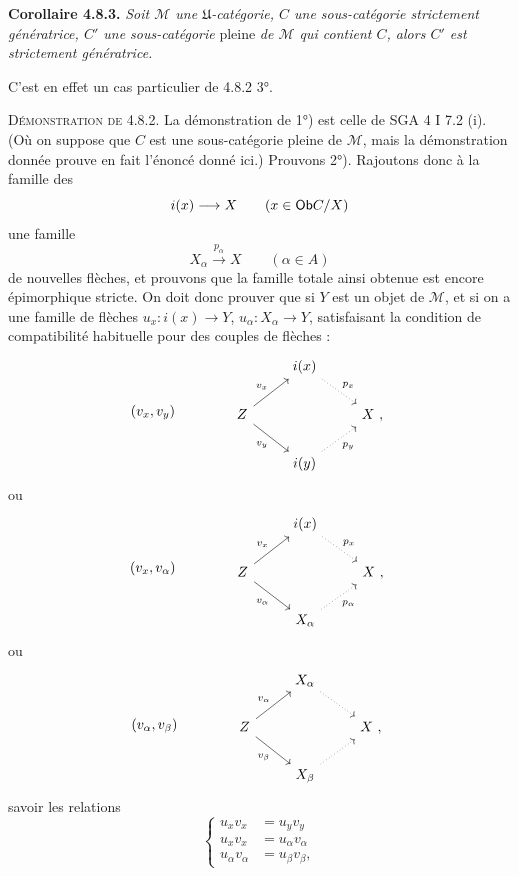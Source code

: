 \textbf{Corollaire 4.8.3.} \textit{Soit $\mathcal{M}$ une $\mathfrak{U}$-catégorie, $C$ une sous-catégorie strictement génératrice, $C'$ une sous-catégorie} pleine \textit{de $\mathcal{M}$ qui contient $C$, alors $C'$ est strictement génératrice.}

C'est en effet un cas particulier de 4.8.2 3°.


\textsc{Démonstration de 4.8.2}. La démonstration de 1°) est celle de SGA 4 I 7.2 (i). (Où on suppose que $C$ est une sous-catégorie pleine de $\mathcal{M}$, mais la démonstration donnée prouve en fait l'énoncé donné ici.) Prouvons 2°). Rajoutons donc à la famille des
\[ i(x) \longrightarrow X \qquad (x \in \mathsf{Ob} C/X) \]
une famille
\[ X_\alpha \xrightarrow{p_\alpha} X \qquad (\alpha \in A) \]
de nouvelles flèches, et prouvons que la famille totale ainsi obtenue est encore épimorphique stricte. On doit donc prouver que si $Y$ est un objet de $\mathcal{M}$, et si on a une famille de flèches $u_x : i(x) \longrightarrow Y$, $u_\alpha : X_\alpha \longrightarrow Y$, satisfaisant la condition de compatibilité habituelle pour des couples de flèches :
\[ (v_x,v_y) \qquad\qquad \begin{tikzcd}
& i(x) \arrow[dr, dotted, "p_x"] & \\
Z \arrow[ur, "v_x"] \arrow[dr, "v_y"'] & & X\ , \\
& i(y) \arrow[ur, dotted, "p_y"'] &
\end{tikzcd} \]
ou
\[ (v_x,v_\alpha) \qquad\qquad \begin{tikzcd}
& i(x) \arrow[dr, dotted, "p_x"] & \\
Z \arrow[ur, "v_x"] \arrow[dr, "v_\alpha"'] & & X\ , \\
& X_\alpha \arrow[ur, dotted, "p_\alpha"'] &
\end{tikzcd} \]
ou
\[ (v_\alpha,v_\beta) \qquad\qquad \begin{tikzcd}
& X_\alpha \arrow[dr, dotted] & \\
Z \arrow[ur, "v_\alpha"] \arrow[dr, "v_\beta"'] & & X\ , \\
& X_\beta \arrow[ur, dotted] &
\end{tikzcd} \]
savoir les relations
\[ \left\{\begin{aligned}
u_xv_x &= u_yv_y\\
u_xv_x &= u_\alpha v_\alpha\\
u_\alpha v_\alpha &= u_\beta v_\beta ,
\end{aligned}\right. \tag*{($*$)} \]
